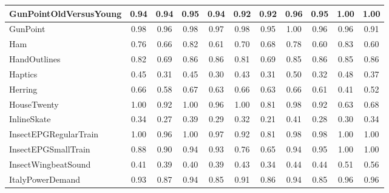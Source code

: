 \begin{table}
{\begin{tabular}{lcccccccccc}
        GunPointOldVersusYoung & 0.94 & 0.94 & 0.95 & 0.94 & 0.92 & 0.92 & 0.96 & 0.95 & 1.00 & 1.00 \\ \hline
        GunPoint & 0.98 & 0.96 & 0.98 & 0.97 & 0.98 & 0.95 & 1.00 & 0.96 & 0.96 & 0.91 \\ \hline
        Ham & 0.76 & 0.66 & 0.82 & 0.61 & 0.70 & 0.68 & 0.78 & 0.60 & 0.83 & 0.60 \\ \hline
        HandOutlines & 0.82 & 0.69 & 0.86 & 0.86 & 0.81 & 0.69 & 0.85 & 0.86 & 0.85 & 0.86 \\ \hline
        Haptics & 0.45 & 0.31 & 0.45 & 0.30 & 0.43 & 0.31 & 0.50 & 0.32 & 0.48 & 0.37 \\ \hline
        Herring & 0.66 & 0.58 & 0.67 & 0.63 & 0.66 & 0.63 & 0.66 & 0.61 & 0.41 & 0.52 \\ \hline
        HouseTwenty & 1.00 & 0.92 & 1.00 & 0.96 & 1.00 & 0.81 & 0.98 & 0.92 & 0.63 & 0.68 \\ \hline
        InlineSkate & 0.34 & 0.27 & 0.39 & 0.29 & 0.32 & 0.21 & 0.41 & 0.28 & 0.30 & 0.34 \\ \hline
        InsectEPGRegularTrain & 1.00 & 0.96 & 1.00 & 0.97 & 0.92 & 0.81 & 0.98 & 0.98 & 1.00 & 1.00 \\ \hline
        InsectEPGSmallTrain & 0.88 & 0.90 & 0.94 & 0.93 & 0.76 & 0.65 & 0.94 & 0.95 & 1.00 & 1.00 \\ \hline
        InsectWingbeatSound & 0.41 & 0.39 & 0.40 & 0.39 & 0.43 & 0.34 & 0.44 & 0.44 & 0.51 & 0.56 \\ \hline
        ItalyPowerDemand & 0.93 & 0.87 & 0.94 & 0.85 & 0.91 & 0.86 & 0.94 & 0.85 & 0.96 & 0.96 \\
        \bottomrule
    \end{tabular}}
    \label{tab:ucr_results}
\end{table}

